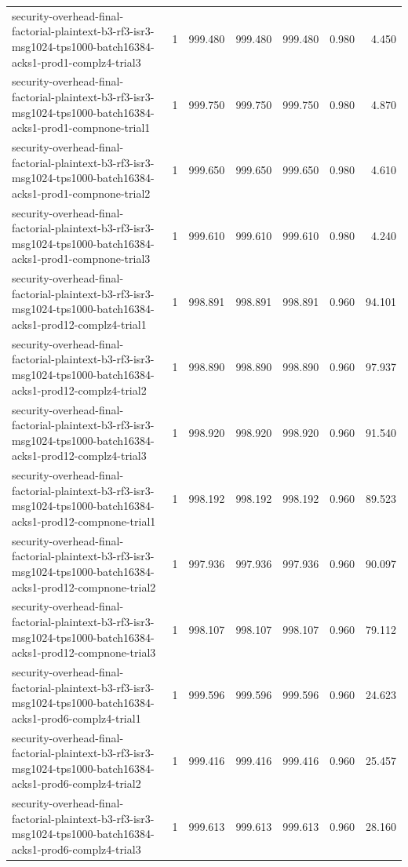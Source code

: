 \begin{tabular}{lrrrrrr}
security-overhead-final-factorial-plaintext-b3-rf3-isr3-msg1024-tps1000-batch16384-acks1-prod1-complz4-trial3 & 1 & 999.480 & 999.480 & 999.480 & 0.980 & 4.450 \\
security-overhead-final-factorial-plaintext-b3-rf3-isr3-msg1024-tps1000-batch16384-acks1-prod1-compnone-trial1 & 1 & 999.750 & 999.750 & 999.750 & 0.980 & 4.870 \\
security-overhead-final-factorial-plaintext-b3-rf3-isr3-msg1024-tps1000-batch16384-acks1-prod1-compnone-trial2 & 1 & 999.650 & 999.650 & 999.650 & 0.980 & 4.610 \\
security-overhead-final-factorial-plaintext-b3-rf3-isr3-msg1024-tps1000-batch16384-acks1-prod1-compnone-trial3 & 1 & 999.610 & 999.610 & 999.610 & 0.980 & 4.240 \\
security-overhead-final-factorial-plaintext-b3-rf3-isr3-msg1024-tps1000-batch16384-acks1-prod12-complz4-trial1 & 1 & 998.891 & 998.891 & 998.891 & 0.960 & 94.101 \\
security-overhead-final-factorial-plaintext-b3-rf3-isr3-msg1024-tps1000-batch16384-acks1-prod12-complz4-trial2 & 1 & 998.890 & 998.890 & 998.890 & 0.960 & 97.937 \\
security-overhead-final-factorial-plaintext-b3-rf3-isr3-msg1024-tps1000-batch16384-acks1-prod12-complz4-trial3 & 1 & 998.920 & 998.920 & 998.920 & 0.960 & 91.540 \\
security-overhead-final-factorial-plaintext-b3-rf3-isr3-msg1024-tps1000-batch16384-acks1-prod12-compnone-trial1 & 1 & 998.192 & 998.192 & 998.192 & 0.960 & 89.523 \\
security-overhead-final-factorial-plaintext-b3-rf3-isr3-msg1024-tps1000-batch16384-acks1-prod12-compnone-trial2 & 1 & 997.936 & 997.936 & 997.936 & 0.960 & 90.097 \\
security-overhead-final-factorial-plaintext-b3-rf3-isr3-msg1024-tps1000-batch16384-acks1-prod12-compnone-trial3 & 1 & 998.107 & 998.107 & 998.107 & 0.960 & 79.112 \\
security-overhead-final-factorial-plaintext-b3-rf3-isr3-msg1024-tps1000-batch16384-acks1-prod6-complz4-trial1 & 1 & 999.596 & 999.596 & 999.596 & 0.960 & 24.623 \\
security-overhead-final-factorial-plaintext-b3-rf3-isr3-msg1024-tps1000-batch16384-acks1-prod6-complz4-trial2 & 1 & 999.416 & 999.416 & 999.416 & 0.960 & 25.457 \\
security-overhead-final-factorial-plaintext-b3-rf3-isr3-msg1024-tps1000-batch16384-acks1-prod6-complz4-trial3 & 1 & 999.613 & 999.613 & 999.613 & 0.960 & 28.160 \\

\end{tabular}
